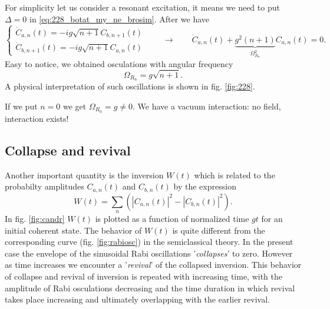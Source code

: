 For simplicity let us consider a resonant excitation, it means we need to put $\Delta  =0$ in \eqref{eq:228_botat_my_ne_brosim}. After we have
\begin{equation}
	\begin{cases}
		\dot{C}_{a,n}(t) = -i g \sqrt{n+1} C_{b,n+1}(t) \\
		\dot{C}_{b,n+1}(t) = -i g \sqrt{n+1} C_{a,n}(t)
	\end{cases} \qquad \to \qquad 
	\ddot{C}_{a,n} (t) + \underbrace{g^2(n+1)}_{\Omega_{R_n}^2} C_{a,n}(t) = 0.
\end{equation}
Easy to notice, we obtained osculations with angular frequency 
\begin{equation}
	\boxed{\Omega_{R_n} = g \sqrt{n+1}.}
\end{equation}
A physical interpretation of such oscillations is shown in fig. \ref{fig:228}.

\begin{testexample}
	If we put $n=0$ we get $\Omega_{R_0} = g \neq 0$. We have a vacuum interaction: no field, interaction exists!
\end{testexample}

\subsection{Collapse and revival}

Another important quantity is the inversion $W(t)$ which is related to the probabilty amplitudes $C_{a,n}(t)$ and $C_{b,n}(t)$ by the expression
\begin{equation}
	W(t) = \sum_{n} \left( \left| C_{a,n}(t) \right|^2 - \left| C_{b,n}(t) \right|^2 \right).
\end{equation}
In fig. \ref{fig:candr} $W(t)$ is plotted as a function of normalized time $g t$ for an initial coherent state. The behavior of $W(t)$ is quite different from the corresponding curve (fig. \ref{fig:rabiosc}) in the semiclassical theory. In the present case the envelope of the sinusoidal Rabi oscillations '\textit{collapses}' to zero. However as time increases we encounter a '\textit{revival}' of the collapsed inversion. This behavior of collapse and revival of inversion is repeated with increasing time, with the amplitude of Rabi osculations decreasing and the time duration in which revival takes place increasing and ultimately overlapping with the earlier revival.

